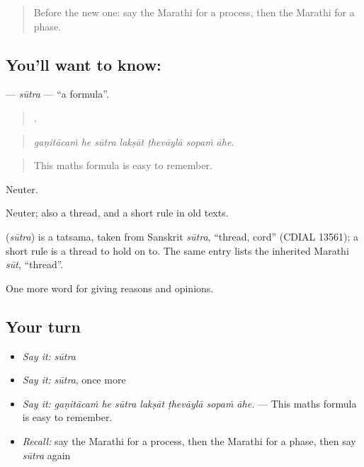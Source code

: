 \label{lesson:MR-C374-sutra}



\begin{quote}
Before the new one: say the Marathi for a process, then the Marathi for a phase.
\end{quote}

\subsection*{You'll want to know: }
\textbf{} — \emph{sūtra} — \textquotedblleft{}a formula\textquotedblright{}.

\begin{quote}
      .
\end{quote}

\begin{quote}
\emph{gaṇitācaṁ he sūtra lakṣāt ṭhevāylā sopaṁ āhe.}
\end{quote}

\begin{quote}
This maths formula is easy to remember.
\end{quote}

Neuter.

Neuter; also a thread, and a short rule in old texts.

\begin{cousinweb}
\textbf{} (\emph{sūtra}) is a tatsama, taken from Sanskrit \emph{sūtra}, \textquotedblleft{}thread, cord\textquotedblright{} (CDIAL 13561); a short rule is a thread to hold on to. The same entry lists the inherited Marathi \emph{sūt}, \textquotedblleft{}thread\textquotedblright{}.
\end{cousinweb}

\begin{grammarlens}[title={What you've built}]
One more word for giving reasons and opinions.
\end{grammarlens}

\subsection*{Your turn}
\begin{itemize}
\raggedright
  \item \emph{Say it:} \emph{sūtra}
  \item \emph{Say it:} \emph{sūtra}, once more
  \item \emph{Say it:} \emph{gaṇitācaṁ he sūtra lakṣāt ṭhevāylā sopaṁ āhe.} — This maths formula is easy to remember.
  \item \emph{Recall:} say the Marathi for a process, then the Marathi for a phase, then say \emph{sūtra} again
\end{itemize}


